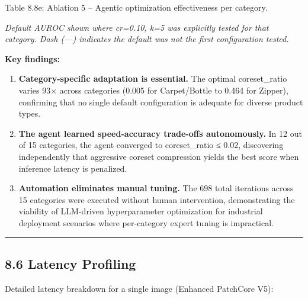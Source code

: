 Table 8.8e: Ablation 5 -- Agentic optimization effectiveness per category.

\emph{Default AUROC shown where cr=0.10, k=5 was explicitly tested for that category. Dash (---) indicates the default was not the first configuration tested.}

\textbf{Key findings:}

\begin{enumerate}
\def\labelenumi{\arabic{enumi}.}
\item
  \textbf{Category-specific adaptation is essential.} The optimal coreset\_ratio varies 93× across categories (0.005 for Carpet/Bottle to 0.464 for Zipper), confirming that no single default configuration is adequate for diverse product types.
\item
  \textbf{The agent learned speed-accuracy trade-offs autonomously.} In 12 out of 15 categories, the agent converged to coreset\_ratio ≤ 0.02, discovering independently that aggressive coreset compression yields the best score when inference latency is penalized.
\item
  \textbf{Automation eliminates manual tuning.} The 698 total iterations across 15 categories were executed without human intervention, demonstrating the viability of LLM-driven hyperparameter optimization for industrial deployment scenarios where per-category expert tuning is impractical.
\end{enumerate}

\begin{center}\rule{0.5\linewidth}{0.5pt}\end{center}

\subsection{8.6 Latency Profiling}\label{latency-profiling}

Detailed latency breakdown for a single image (Enhanced PatchCore V5):

